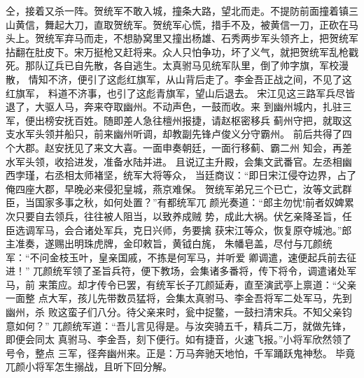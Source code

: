 仝，接着又杀一阵。贺统军不敢入城，撞条大路，望北而走。不提防前面撞着镇三
山黄信，舞起大刀，直取贺统军。贺统军心慌，措手不及，被黄信一刀，正砍在马
头上。贺统军弃马而走，不想胁窝里又撞出杨雄、石秀两步军头领齐上，把贺统军
拈翻在肚皮下。宋万挺枪又赶将来。众人只怕争功，坏了义气，就把贺统军乱枪戳
死。那队辽兵已自先散，各自逃生。太真驸马见统军队里，倒了帅字旗，军校漫散，
情知不济，便引了这彪红旗军，从山背后走了。李金吾正战之间，不见了这红旗军，
料道不济事，也引了这彪青旗军，望山后退去。
宋江见这三路军兵尽皆退了，大驱人马，奔来夺取幽州。不动声色，一鼓而收。来
到幽州城内，扎驻三军，便出榜安抚百姓。随即差人急往檀州报捷，请赵枢密移兵
蓟州守把，就取这支水军头领并船只，前来幽州听调，却教副先锋卢俊义分守霸州。
前后共得了四个大郡。赵安抚见了来文大喜。一面申奏朝廷，一面行移蓟、霸二州
知会，再差水军头领，收拾进发，准备水陆并进。
且说辽主升殿，会集文武番官。左丞相幽西孛瑾，右丞相太师褚坚，统军大将等众，
当廷商议：“即日宋江侵夺边界，占了俺四座大郡，早晚必来侵犯皇城，燕京难保。
贺统军弟兄三个已亡，汝等文武群臣，当国家多事之秋，如何处置？”有都统军兀
颜光奏道：“郎主勿忧!前者奴婢累次只要自去领兵，往往被人阻当，以致养成贼
势，成此大祸。伏乞亲降圣旨，任臣选调军马，会合诸处军兵，克日兴师，务要擒
获宋江等众，恢复原夺城池。”郎主准奏，遂赐出明珠虎牌，金印敕旨，黄钺白旄，
朱幡皂盖，尽付与兀颜统军：“不问金枝玉叶，皇亲国戚，不拣是何军马，并听爱
卿调遣，速便起兵前去征进！”
兀颜统军领了圣旨兵符，便下教场，会集诸多番将，传下将令，调遣诸处军马，前
来策应。却才传令已罢，有统军长子兀颜延寿，直至演武亭上禀道：“父亲一面整
点大军，孩儿先带数员猛将，会集太真驸马、李金吾将军二处军马，先到幽州，杀
败这蛮子们八分。待父亲来时，瓮中捉鳖，一鼓扫清宋兵。不知父亲钧意如何？”
兀颜统军道：“吾儿言见得是。与汝突骑五千，精兵二万，就做先锋，即便会同太
真驸马、李金吾，刻下便行。如有捷音，火速飞报。”小将军欣然领了号令，整点
三军，径奔幽州来。正是：万马奔驰天地怕，千军踊跃鬼神愁。
毕竟兀颜小将军怎生搦战，且听下回分解。